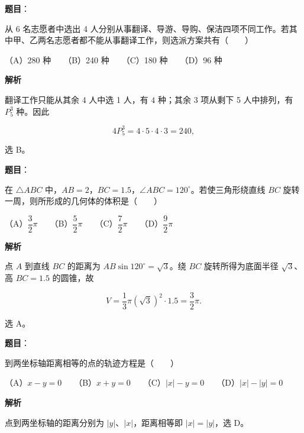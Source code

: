 \begin{answer}

\textbf{题目}：

从 6 名志愿者中选出 4 人分别从事翻译、导游、导购、保洁四项不同工作。若其中甲、乙两名志愿者都不能从事翻译工作，则选派方案共有\mbox{（　　）}

（A）280 种　　（B）240 种　　（C）180 种　　（D）96 种

\textbf{解析}

翻译工作只能从其余 4 人中选 1 人，有 $4$ 种；其余 3 项从剩下 5 人中排列，有 $P_5^3$ 种。因此

\nopagebreak[4]
\[
4P_5^3=4\cdot5\cdot4\cdot3=240,
\]

选 B。


\end{answer}
\begin{answer}

\textbf{题目}：

在 $\triangle ABC$ 中，$AB=2$，$BC=1.5$，$\angle ABC=120^\circ$。若使三角形绕直线 $BC$ 旋转一周，则所形成的几何体的体积是\mbox{（　　）}

（A）$\dfrac32\pi$　　（B）$\dfrac52\pi$　　（C）$\dfrac72\pi$　　（D）$\dfrac92\pi$

\textbf{解析}

点 $A$ 到直线 $BC$ 的距离为 $AB\sin120^\circ=\sqrt3$。绕 $BC$ 旋转所得为底面半径 $\sqrt3$、高 $BC=1.5$ 的圆锥，故

\nopagebreak[4]
\[
V=\frac13\pi(\sqrt3)^2\cdot1.5=\frac32\pi.
\]

选 A。


\end{answer}
\begin{answer}

\textbf{题目}：

到两坐标轴距离相等的点的轨迹方程是\mbox{（　　）}

（A）$x-y=0$　　（B）$x+y=0$　　（C）$|x|-y=0$　　（D）$|x|-|y|=0$

\textbf{解析}

点到两坐标轴的距离分别为 $|y|$、$|x|$，距离相等即 $|x|=|y|$，选 D。


\end{answer}
